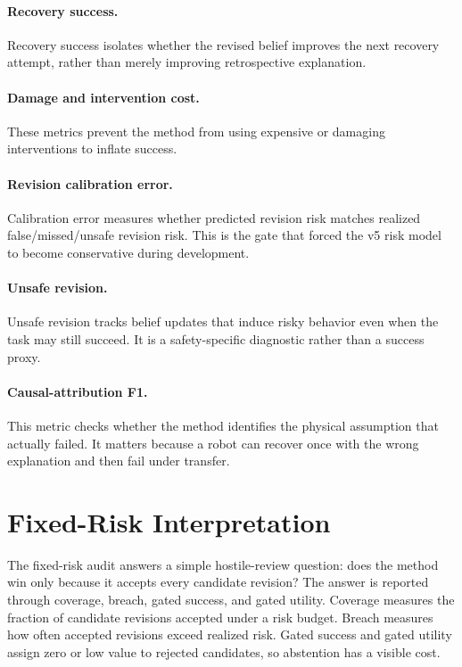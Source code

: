 \documentclass{article}
\begin{document}
\paragraph{Recovery success.} Recovery success isolates whether the revised belief improves the next recovery attempt, rather than merely improving retrospective explanation.

\paragraph{Damage and intervention cost.} These metrics prevent the method from using expensive or damaging interventions to inflate success.

\paragraph{Revision calibration error.} Calibration error measures whether predicted revision risk matches realized false/missed/unsafe revision risk. This is the gate that forced the v5 risk model to become conservative during development.

\paragraph{Unsafe revision.} Unsafe revision tracks belief updates that induce risky behavior even when the task may still succeed. It is a safety-specific diagnostic rather than a success proxy.

\paragraph{Causal-attribution F1.} This metric checks whether the method identifies the physical assumption that actually failed. It matters because a robot can recover once with the wrong explanation and then fail under transfer.

\clearpage
\section{Fixed-Risk Interpretation}
The fixed-risk audit answers a simple hostile-review question: does the method win only because it accepts every candidate revision? The answer is reported through coverage, breach, gated success, and gated utility. Coverage measures the fraction of candidate revisions accepted under a risk budget. Breach measures how often accepted revisions exceed realized risk. Gated success and gated utility assign zero or low value to rejected candidates, so abstention has a visible cost.
\end{document}

